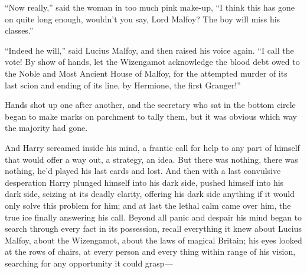“Now really,” said the woman in too much pink make-up, “I think this has gone on quite long enough, wouldn’t you say, Lord Malfoy? The boy will miss his classes.”

“Indeed he will,” said Lucius Malfoy, and then raised his voice again. “I call the vote! By show of hands, let the Wizengamot acknowledge the blood debt owed to the Noble and Most Ancient House of Malfoy, for the attempted murder of its last scion and ending of its line, by Hermione, the first Granger!”

Hands shot up one after another, and the secretary who sat in the bottom circle began to make marks on parchment to tally them, but it was obvious which way the majority had gone.

And Harry screamed inside his mind, a frantic call for help to any part of himself that would offer a way out, a strategy, an idea. But there was nothing, there was nothing, he’d played his last cards and lost. And then with a last convulsive desperation Harry plunged himself into his dark side, pushed himself into his dark side, seizing at its deadly clarity, offering his dark side anything if it would only solve this problem for him; and at last the lethal calm came over him, the true ice finally answering his call. Beyond all panic and despair his mind began to search through every fact in its possession, recall everything it knew about Lucius Malfoy, about the Wizengamot, about the laws of magical Britain; his eyes looked at the rows of chairs, at every person and every thing within range of his vision, searching for any opportunity it could grasp—

